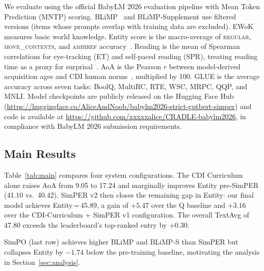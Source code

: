 \documentclass[11pt]{article}
\begin{document}
We evaluate using the official BabyLM 2026 evaluation pipeline
with Mean Token Prediction (MNTP) scoring.
BLiMP~\citep{warstadt-etal-2020-blimp} and BLiMP-Supplement use filtered versions
(items whose prompts overlap with training data are excluded).
EWoK~\citep{ivanova-etal-2024-ewok} measures basic world knowledge.
Entity score is the macro-average of \textsc{regular},
\textsc{move\_contents}, and \textsc{ambiref} accuracy~\citep{kim-schuster-2023}.
Reading is the mean of Spearman correlations for eye-tracking (ET)
and self-paced reading (SPR), treating reading time as a proxy
for surprisal~\citep{levy-2008}.
AoA is the Pearson $r$ between model-derived acquisition ages and
CDI human norms~\citep{fenson-etal-1994}, multiplied by 100.
GLUE is the average accuracy across seven tasks:
BoolQ, MultiRC, RTE, WSC, MRPC, QQP, and MNLI.
Model checkpoints are publicly released on the Hugging Face Hub
(\url{https://huggingface.co/AliceAndNoob/babylm2026-strict-gptbert-simper})
and code is available at
\url{https://github.com/xxxxxalice/CRADLE-babylm2026},
in compliance with BabyLM 2026 submission requirements.

\subsection{Main Results}

Table~\ref{tab:main} compares four system configurations.
The CDI Curriculum alone raises AoA from 9.05 to 17.24 and
marginally improves Entity pre-SimPER (41.10 vs.\ 40.42).
SimPER v2 then closes the remaining gap in Entity:
our final model achieves Entity\,=\,45.89,
a gain of $+5.47$ over the Q baseline
and $+3.16$ over the CDI-Curriculum + SimPER v1 configuration.
The overall TextAvg of 47.80 exceeds the leaderboard's top-ranked
entry by $+0.30$.

SimPO (last row) achieves higher BLiMP and BLiMP-S than SimPER
but collapses Entity by $-1.74$ below the pre-training baseline,
motivating the analysis in Section~\ref{sec:analysis}.
\end{document}
